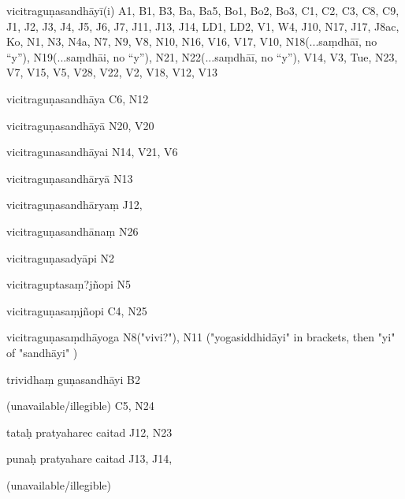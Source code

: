 \begin{ekdosis}
\begin{marma}[hp01_055]
\begin{marma}[hp02_009]
\begin{marma}[hp02_011]
        \begin{marma}[hp02_023c]
        \item[vicitraguṇasandhāyī(i)] A1, B1, B3, Ba, Ba5, Bo1, Bo2, Bo3, C1, C2, C3, C8, C9, J1, J2, J3, J4, J5, J6, J7, J11, J13, J14, LD1, LD2, V1, W4, J10, N17, J17, J8ac, Ko, N1, N3, N4a, N7, N9, V8, N10, N16, V16, V17, V10, N18(...saṃdhāī, no “y”), N19(...saṃdhāi, no “y”), N21, N22(...saṃdhāī, no “y”), V14, V3, Tue, N23, V7, V15, V5, V28, V22, V2, V18, V12, V13
        \item[vicitraguṇasandhāya]  C6, N12
        \item[vicitraguṇasandhāyā] N20, V20
        \item[vicitragunasandhāyai]  N14, V21, V6
        \item[vicitraguṇasandhāryā]  N13
        \item[vicitraguṇasandhāryaṃ]  J12,
        \item[vicitraguṇasandhānaṃ] N26
        \item[vicitraguṇasadyāpi] N2
        \item[vicitraguptasaṃ?jñopi] N5
        \item[vicitraguṇasaṃjñopi] C4, N25
        \item[vicitraguṇasaṃdhāyoga]  N8("vivi?"), N11 ("yogasiddhidāyi" in brackets, then "yi" of "sandhāyi" )
        \item[trividhaṃ guṇasandhāyi] B2
        \item[(unavailable/illegible)] C5, N24
          \begin{description}

          \end{description}
        \end{marma}


        \begin{marma}[hp02_24c]
        \item[tataḥ pratyaharec caitad] J12, N23
        \item[punaḥ pratyahare caitad] J13, J14, 
        \item[(unavailable/illegible)]
          \begin{description}

          \end{description}
        \end{marma}



\end{marma}
\end{marma}
\end{marma}
\end{ekdosis}

